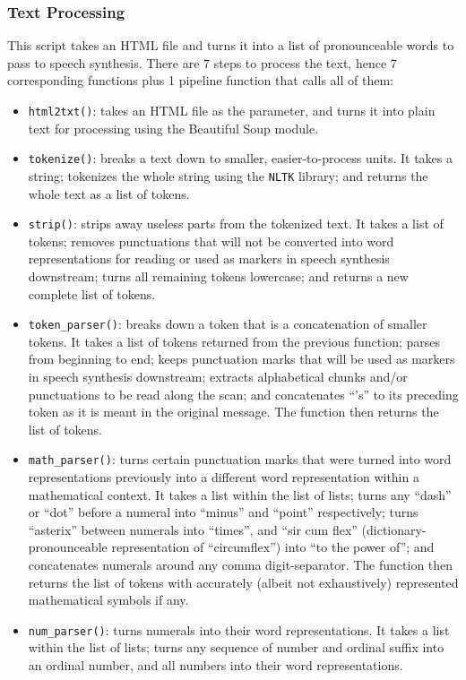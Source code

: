 \documentclass{article}
\begin{document}
\subsubsection{Text Processing}
This script takes an HTML file and turns it into a list of pronounceable words to pass to speech synthesis. There are 7 steps to process the text, hence 7 corresponding functions plus 1 pipeline function that calls all of them:
 \begin{itemize}
 \item \texttt{html2txt()}: takes an HTML file as the parameter, and turns it into plain text for processing using the Beautiful Soup module.
 \item \texttt{tokenize()}: breaks a text down to smaller, easier-to-process units. It takes a string; tokenizes the whole string using the \texttt{NLTK} library; and returns the whole text as a list of tokens.
 \item \texttt{strip()}: strips away useless parts from the tokenized text. It takes a list of tokens; removes punctuations that will not be converted into word representations for reading or used as markers in speech synthesis downstream; turns all remaining tokens lowercase; and returns a new complete list of tokens.
 \item \texttt{token\_parser()}: breaks down a token that is a concatenation of smaller tokens. It takes a list of tokens returned from the previous function; parses from beginning to end; keeps punctuation marks that will be used as markers in speech synthesis downstream; extracts alphabetical chunks and/or punctuations to be read along the scan; and concatenates “'s” to its preceding token as it is meant in the original message. The function then returns the list of tokens.
 \item \texttt{math\_parser()}: turns certain punctuation marks that were turned into word representations previously into a different word representation within a mathematical context. It takes a list within the list of lists; turns any “dash” or “dot” before a numeral into “minus” and “point” respectively; turns “asterix” between numerals into “times”, and “sir cum flex” (dictionary-pronounceable representation of “circumflex”) into “to the power of”; and concatenates numerals around any comma digit-separator. The function then returns the list of tokens with accurately (albeit not exhaustively) represented mathematical symbols if any.
 \item \texttt{num\_parser()}: turns numerals into their word representations. It takes a list within the list of lists; turns any sequence of number and ordinal suffix into an ordinal number, and all numbers into their word representations.
 \end{itemize}
\end{document}
